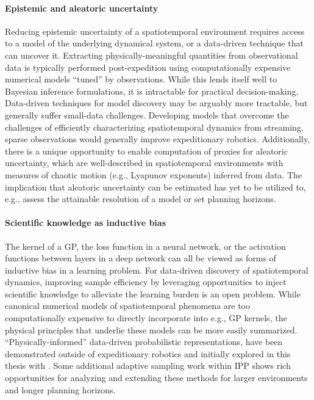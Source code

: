 \paragraph{Epistemic and aleatoric uncertainty}
Reducing epistemic uncertainty of a spatiotemporal environment requires access to a model of the underlying dynamical system, or a data-driven technique that can uncover it. Extracting physically-meaningful quantities from observational data is typically performed post-expedition using computationally expensive numerical models ``tuned'' by observations. While this lends itself well to Bayesian inference formulations, it is intractable for practical decision-making. Data-driven techniques for model discovery\autocite{raissi2019physics} may be arguably more tractable, but generally suffer small-data challenges. Developing models that overcome the challenges of efficiently characterizing spatiotemporal dynamics from streaming, sparse observations would generally improve expeditionary robotics. Additionally, there is a unique opportunity to enable computation of proxies for aleatoric uncertainty, which are well-described in spatiotemporal environments with measures of chaotic motion (e.g., Lyapunov exponents) inferred from data\autocite{blanchard2019analytical}. The implication that aleatoric uncertainty can be estimated has yet to be utilized to, e.g., assess the attainable resolution of a model or set planning horizons.

\paragraph{Scientific knowledge as inductive bias}
The kernel of a GP, the loss function in a neural network, or the activation functions between layers in a deep network can all be viewed as forms of inductive bias in a learning problem. For data-driven discovery of spatiotemporal dynamics, improving sample efficiency by leveraging opportunities to inject scientific knowledge to alleviate the learning burden is an open problem. While canonical numerical models of spatiotemporal phenomena are too computationally expensive to directly incorporate into e.g., GP kernels, the physical principles that underlie these models can be more easily summarized. ``Physically-informed'' data-driven probabilistic representations, have been demonstrated outside of expeditionary robotics\autocite{raissi2019physics} and initially explored in this thesis with \PHUMES. Some additional adaptive sampling work within IPP\autocite{salam2019adaptive} shows rich opportunities for analyzing and extending these methods for larger environments and longer planning horizons.



